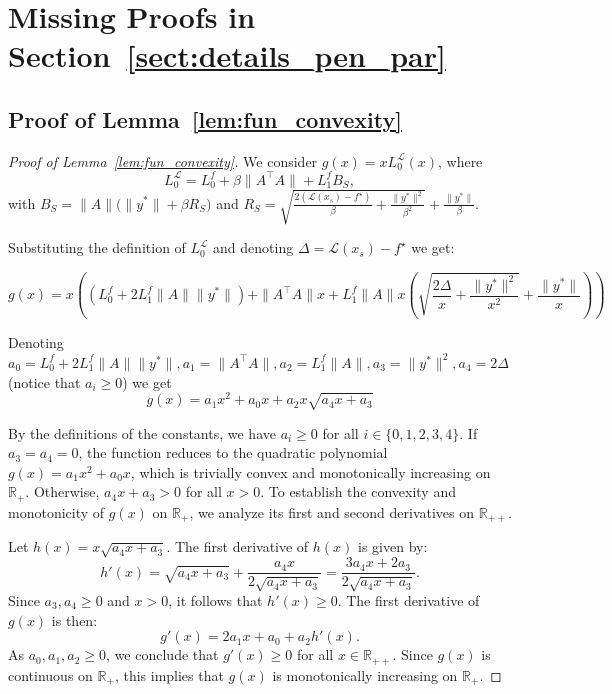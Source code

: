\documentclass[runningheads]{llncs}
\begin{document}
	\section{Missing Proofs in Section~\ref{sect:details_pen_par}}
	
	\subsection{Proof of Lemma~\ref{lem:fun_convexity}}\label{sect:ap:fun_convexity}
	
	\begin{proof}[Proof of Lemma~\ref{lem:fun_convexity}]
		We consider $g(x) = x L_0^{\mathcal{L}}(x)$, where 
		$$
		L_0^{\mathcal{L}}
		=
		L_0^f
		+
		\beta\|A^\top A\|
		+
		L_1^f B_S,
		$$
		with
		$B_S=\|A\|\bigl(\|y^*\|+\beta R_S\bigr)$
		and
		$R_S=\sqrt{\frac{2(\mathcal{L}(x_s)-f^\star)}{\beta}+\frac{\|y^*\|^2}{\beta^2}}+\frac{\|y^*\|}{\beta}.$
		
		Substituting the definition of $L_0^{\mathcal{L}}$ and denoting $\Delta = \mathcal{L}(x_s)-f^\star$ we get:
		
		$$
		g(x) = x \left( \left( L_0^f + 2 L_1^f \| A \| \| y^* \| \right) + \| A^\top A\| x + L_1^f \| A \| x \left(\sqrt{\frac{2 \Delta}{x} + \frac{\| y^* \|^2}{x^2} } + \frac{\| y^* \|}{x} \right) \right)
		$$
		
		Denoting $a_0 = L_0^f + 2 L_1^f \| A \| \| y^* \|, a_1 = \| A^\top A\|, a_2 = L_1^f \| A \|, a_3 = \| y^* \|^2, a_4 = 2 \Delta$ (notice that $a_i \geq 0$) we get
		\begin{equation}\label{lem:fun_convexity:eq_a}
			g(x) = a_1 x^2 + a_0 x + a_2 x \sqrt{a_4 x + a_3}
		\end{equation}
		
		By the definitions of the constants, we have $a_i \geq 0$ for all $i \in \{0, 1, 2, 3, 4\}$. 
		If $a_3 = a_4 = 0$, the function reduces to the quadratic polynomial $g(x) = a_1 x^2 + a_0 x$, which is trivially convex and monotonically increasing on $\mathbb{R}_{+}$. 
		Otherwise, $a_4 x + a_3 > 0$ for all $x > 0$. To establish the convexity and monotonicity of $g(x)$ on $\mathbb{R}_{+}$, we analyze its first and second derivatives on $\mathbb{R}_{++}$.
		
		Let $h(x) = x \sqrt{a_4 x + a_3}$. The first derivative of $h(x)$ is given by:
		\begin{equation*}
			h'(x) = \sqrt{a_4 x + a_3} + \frac{a_4 x}{2\sqrt{a_4 x + a_3}} = \frac{3a_4 x + 2a_3}{2\sqrt{a_4 x + a_3}}.
		\end{equation*}
		Since $a_3, a_4 \geq 0$ and $x > 0$, it follows that $h'(x) \geq 0$. 
		The first derivative of $g(x)$ is then:
		\begin{equation*}
			g'(x) = 2a_1 x + a_0 + a_2 h'(x).
		\end{equation*}
		As $a_0, a_1, a_2 \geq 0$, we conclude that $g'(x) \geq 0$ for all $x \in \mathbb{R}_{++}$. Since $g(x)$ is continuous on $\mathbb{R}_{+}$, this implies that $g(x)$ is monotonically increasing on $\mathbb{R}_{+}$.
		

\end{proof}
\end{document}
